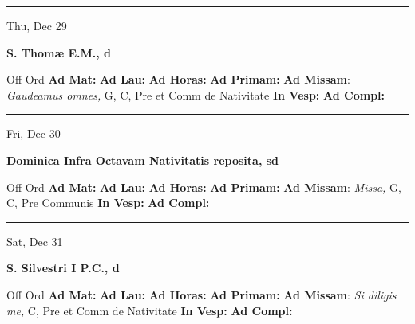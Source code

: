 \documentclass[letterpaper, 10pt]{article}
\begin{document}
\hrule
\begin{center}
Thu, Dec 29
\end{center}\textbf{ \large S. Thomæ E.M., \textnormal{\normalsize d}}
\begin{justify}
Off Ord
\textbf{Ad Mat: }
\textbf{Ad Lau: }
\textbf{Ad Horas: }
\textbf{Ad Primam: }
\textbf{Ad Missam}: \textit{Gaudeamus omnes,} G, C, Pre et Comm de Nativitate
\textbf{In Vesp: }
\textbf{Ad Compl: }\end{justify}



\hrule
\begin{center}
Fri, Dec 30
\end{center}\textbf{ \large Dominica Infra Octavam Nativitatis reposita, \textnormal{\normalsize sd}}
\begin{justify}
Off Ord
\textbf{Ad Mat: }
\textbf{Ad Lau: }
\textbf{Ad Horas: }
\textbf{Ad Primam: }
\textbf{Ad Missam}: \textit{Missa,} G, C, Pre Communis
\textbf{In Vesp: }
\textbf{Ad Compl: }\end{justify}



\hrule
\begin{center}
Sat, Dec 31
\end{center}\textbf{ \large S. Silvestri I P.C., \textnormal{\normalsize d}}
\begin{justify}
Off Ord
\textbf{Ad Mat: }
\textbf{Ad Lau: }
\textbf{Ad Horas: }
\textbf{Ad Primam: }
\textbf{Ad Missam}: \textit{Si diligis me,} C, Pre et Comm de Nativitate
\textbf{In Vesp: }
\textbf{Ad Compl: }\end{justify}
\end{document}
